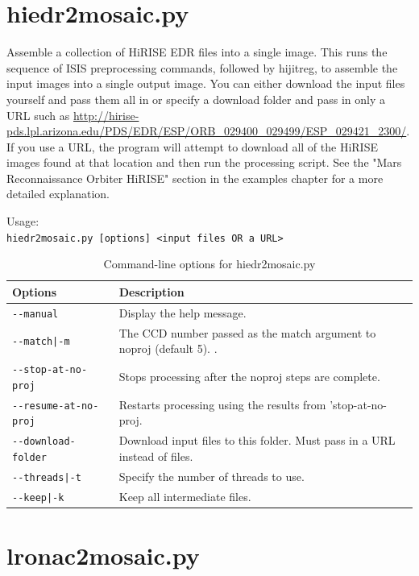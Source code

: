 \section{hiedr2mosaic.py}
\label{hiedr2mosaic.py}

Assemble a collection of HiRISE EDR files into a single image.  This runs the sequence of ISIS preprocessing
commands, followed by hijitreg, to assemble the input images into a single output image.  You can either download
the input files yourself and pass them all in or specify a download folder and pass in only a URL such as
\url{http://hirise-pds.lpl.arizona.edu/PDS/EDR/ESP/ORB_029400_029499/ESP_029421_2300/}.  If you use a URL,
the program will attempt to download all of the HiRISE images found at that location and then run the processing
script.  See the "Mars Reconnaissance Orbiter HiRISE" section in the examples chapter for a more 
detailed explanation.

\medskip

Usage:\\
\hspace*{2em}\texttt{hiedr2mosaic.py [options] <input files OR a URL>}

\medskip

\begin{longtable}{|l|p{10cm}|}
\caption{Command-line options for hiedr2mosaic.py}
\label{tbl:hiedr2mosaic}
\endfirsthead
\endhead
\endfoot
\endlastfoot
\hline
Options & Description \\ \hline \hline
\texttt{-\/-manual} & Display the help message.\\ \hline
\texttt{-\/-match|-m} & The CCD number passed as the match argument to noproj (default 5). .\\ \hline
\texttt{-\/-stop-at-no-proj} & Stops processing after the noproj steps are complete. \\ \hline
\texttt{-\/-resume-at-no-proj} & Restarts processing using the results from 'stop-at-no-proj. \\ \hline
\texttt{-\/-download-folder} & Download input files to this folder.  Must pass in a URL instead of files. \\ \hline
\texttt{-\/-threads|-t} & Specify the number of threads to use.\\ \hline
\texttt{-\/-keep|-k} & Keep all intermediate files.\\ \hline
\end{longtable}

\section{lronac2mosaic.py}
\label{lronac2mosaic}

